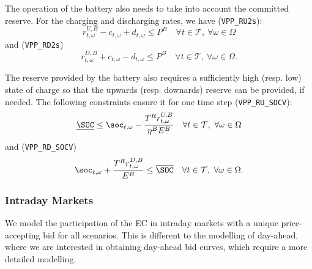 The operation of the battery also needs to take into account the committed reserve. For the charging and discharging rates, we have (\verb|VPP_RU2s|):
\begin{equation} \label{EQ:VPP_RU2s}
	r^{U, B} _{t, \omega} - c_{t, \omega} + d_{t, \omega}  \leq P^B \quad \forall t \in \mathcal{T}, \ \forall \omega \in \Omega
\end{equation}
and (\verb|VPP_RD2s|)
\begin{equation} \label{EQ:VPP_RD2s}
	r^{D, B}_{t, \omega} + c_{t, \omega} - d_{t, \omega} \leq P^B \quad \forall t \in \mathcal{T}, \ \forall \omega \in \Omega.
\end{equation}

The reserve provided by the battery also requires a sufficiently high (resp. low) state of charge so that the upwards (resp. downards) reserve can be provided, if needed. The following constraints ensure it for one time step (\verb|VPP_RU_SOCV|):
\begin{equation} \label{EQ:VPP_RU_SOCV}
	\underline{\SOC} \leq \soc_{t, \omega} - \frac{T^R r^{U, B}_{t, \omega}}{\eta^B E^B} \quad \forall t \in \mathcal{T}, \ \forall \omega \in \Omega
\end{equation}
and  (\verb|VPP_RD_SOCV|)
\begin{equation} \label{EQ:VPP_RD_SOCV}
	\soc_{t, \omega} + \frac{T^R r^{D, B}_{t, \omega} }{E^B} \leq \overline{\SOC} \quad \forall t \in \mathcal{T}, \ \forall \omega \in \Omega.
\end{equation}

\subsubsection{Intraday Markets}

We model the participation of the EC in intraday markets with a unique price-accepting bid for all scenarios. This is different to the modelling of day-ahead, where we are interested in obtaining day-ahead bid curves, which require a more detailed modelling.


